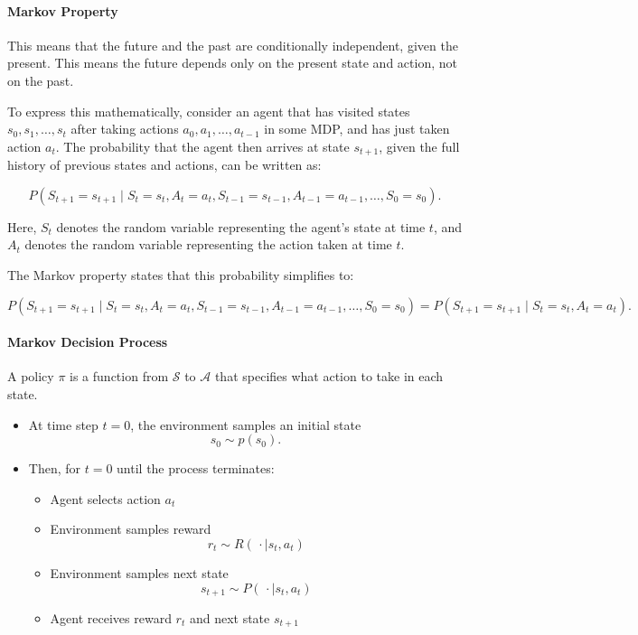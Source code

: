 \documentclass[11pt]{article}
\begin{document}
\paragraph*{Markov Property}

This means that the future and the past are conditionally independent, given the present. This means 
the future depends only on the present state and action, not on the past.

\medskip

To express this mathematically, consider an agent that has visited states 
\(s_0, s_1, \ldots, s_t\) after taking actions 
\(a_0, a_1, \ldots, a_{t-1}\) in some MDP, and has just taken action \(a_t\).
The probability that the agent then arrives at state \(s_{t+1}\),
given the full history of previous states and actions, can be written as:

\[
P(S_{t+1} = s_{t+1} \mid 
S_t = s_t, A_t = a_t, 
S_{t-1} = s_{t-1}, A_{t-1} = a_{t-1}, 
\ldots, 
S_0 = s_0).
\]

Here, \(S_t\) denotes the random variable representing the agent's state at time \(t\),
and \(A_t\) denotes the random variable representing the action taken at time \(t\).

The Markov property states that this probability simplifies to:

\[
P(S_{t+1} = s_{t+1} \mid 
S_t = s_t, A_t = a_t, 
S_{t-1} = s_{t-1}, A_{t-1} = a_{t-1}, 
\ldots, 
S_0 = s_0)
=
P(S_{t+1} = s_{t+1} \mid S_t = s_t, A_t = a_t).
\]

\pagebreak

\paragraph*{Markov Decision Process}

A policy $\pi$ is a function from $\mathcal{S}$ to $\mathcal{A}$ that specifies what action to take in each state.



\begin{itemize}
    \item At time step $t = 0$, the environment samples an initial state 
    \[
        s_0 \sim p(s_0).
    \]

    \item Then, for $t = 0$ until the process terminates:
    \begin{itemize}
        \item Agent selects action $a_t$
        \item Environment samples reward 
        \[
            r_t \sim R(\,\cdot \mid s_t, a_t)
        \]
        \item Environment samples next state 
        \[
            s_{t+1} \sim P(\,\cdot \mid s_t, a_t)
        \]
        \item Agent receives reward $r_t$ and next state $s_{t+1}$
    \end{itemize}
  

\end{itemize}
\end{document}
